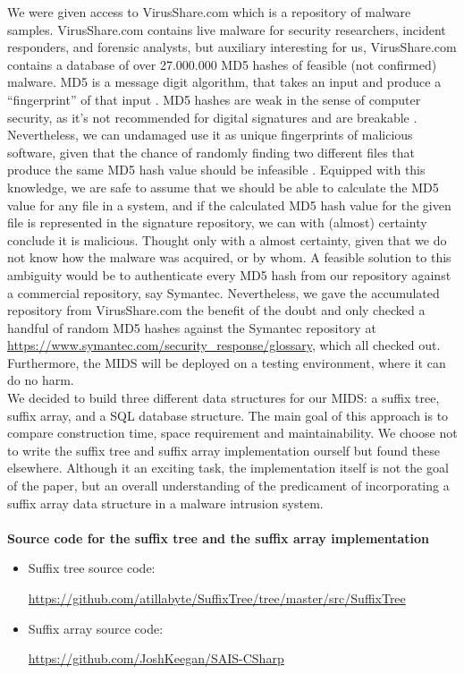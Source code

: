 \documentclass[12pt]{article} %
\begin{document}
We were given access to VirusShare.com \cite{virusshare} which is a repository of malware samples. VirusShare.com contains live malware for security researchers, incident responders, and forensic analysts, but auxiliary interesting for us, VirusShare.com contains a database of over 27.000.000 MD5 hashes of feasible (not confirmed) malware. MD5 is a message digit algorithm, that takes an input and produce a “fingerprint” of that input \cite{turner2011updated}. MD5 hashes are weak in the sense of computer security, as it's not recommended for digital signatures and are breakable  \cite{turner2011updated, wang2005break}. Nevertheless, we can undamaged use it as unique fingerprints of malicious software, given that the chance of randomly finding two different files that produce the same MD5 hash value should be infeasible \cite{thompson2005md5}. Equipped with this knowledge, we are safe to assume that we should be able to calculate the MD5 value for any file in a system,  and if the calculated MD5 hash value for the given file is represented in the signature repository, we can with (almost) certainty conclude it is malicious. Thought only with a almost certainty, given that we do not know how the malware was acquired, or by whom. A feasible solution to this ambiguity would be to authenticate every MD5 hash from our repository against a commercial repository, say Symantec. Nevertheless, we gave the accumulated repository from VirusShare.com  the benefit of the doubt and only checked a handful of random MD5 hashes against the Symantec repository at \href{https://www.symantec.com/security_response/glossary/define.jsp?letter=m&word=md5-hash}{https://www.symantec.com/security\_response/glossary}, which all checked out. Furthermore, the MIDS will be deployed on a testing environment, where it can do no harm. \\
We decided to build three different data structures for our MIDS: a suffix tree, suffix array, and a SQL database structure. The main goal of this approach is to compare construction time, space requirement and maintainability. We choose not to write the suffix tree and suffix array implementation ourself but found these elsewhere. Although it an exciting task, the implementation itself is not the goal of the paper, but an overall understanding of the predicament of incorporating a suffix array data structure in a malware intrusion system. \\ \\
\textbf{Source code for the suffix tree and the suffix array implementation} 
\begin{itemize}
  \item Suffix tree source code:
  \begin{sloppypar}
 \href{https://github.com/atillabyte/SuffixTree/tree/master/src/SuffixTree}{https://github.com/atillabyte/SuffixTree/tree/master/src/SuffixTree}
\end{sloppypar}
  \item Suffix array source code: 
    \begin{sloppypar}
\href{https://github.com/JoshKeegan/SAIS-CSharp}{https://github.com/JoshKeegan/SAIS-CSharp}
\end{sloppypar}
\end{itemize}
\end{document}
